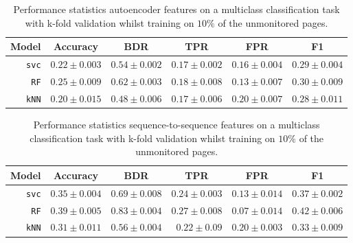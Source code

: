 \begin{table}[ht]
  \centering
  \begin{tabular}{ r  r  r  r  r  r } \hline
    \multicolumn{1}{c}{\textbf{Model}} & \multicolumn{1}{c}{\textbf{Accuracy}} & \multicolumn{1}{c}{\textbf{BDR}} & \multicolumn{1}{c}{\textbf{TPR}} &
      \multicolumn{1}{c}{\textbf{FPR}} & \multicolumn{1}{c}{\textbf{F1}} \\ \hline

    \texttt{svc} & $0.22 \pm 0.003$ & $0.54 \pm 0.002$ & $0.17 \pm 0.002$ & $0.16 \pm 0.004$ & $0.29 \pm 0.004$ \\

    \texttt{RF} & $0.25 \pm 0.009$ & $0.62 \pm 0.003$ & $0.18 \pm 0.008$ & $0.13 \pm 0.007$ & $0.30 \pm 0.009$\\

    \texttt{kNN} & $0.20 \pm 0.015$ & $0.48 \pm 0.006$ & $0.17 \pm 0.006$ & $0.20 \pm 0.007$ & $0.28 \pm 0.011$ \\

    \hline
  \end{tabular}
  \caption{Performance statistics autoencoder features on a multiclass classification task with k-fold validation whilst training on $10\%$ of the unmonitored pages.}
  \label{table:mult-ae-test-error}
\end{table}

\begin{table}[!htb]
  \centering
  \begin{tabular}{ r  r  r  r  r  r } \hline
    \multicolumn{1}{c}{\textbf{Model}} & \multicolumn{1}{c}{\textbf{Accuracy}} & \multicolumn{1}{c}{\textbf{BDR}} & \multicolumn{1}{c}{\textbf{TPR}} &
      \multicolumn{1}{c}{\textbf{FPR}} & \multicolumn{1}{c}{\textbf{F1}} \\ \hline

    \texttt{svc} & $0.35 \pm 0.004$ & $0.69 \pm 0.008$ & $0.24 \pm 0.003$ & $0.13 \pm 0.014$ & $0.37 \pm 0.002$ \\

    \texttt{RF} & $0.39 \pm 0.005$ & $0.83 \pm 0.004$ & $0.27 \pm 0.008$ & $0.07 \pm 0.014$ & $0.42 \pm 0.006$\\

    \texttt{kNN} & $0.31 \pm 0.011$ & $0.56 \pm 0.004$ & $0.22 \pm 0.09$ & $0.20 \pm 0.003$ & $0.33 \pm 0.009$ \\

    \hline
  \end{tabular}
  \caption{Performance statistics sequence-to-sequence features on a multiclass classification task with k-fold validation whilst training on $10\%$ of the unmonitored pages.}
  \label{table:mult-seq2seq-test-error}
\end{table}


